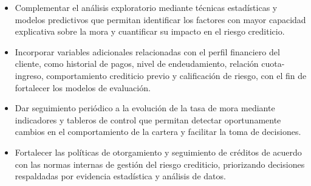 \begin{itemize}
    \item Complementar el análisis exploratorio mediante técnicas estadísticas y modelos predictivos que permitan identificar los factores con mayor capacidad explicativa sobre la mora y cuantificar su impacto en el riesgo crediticio.
    \item Incorporar variables adicionales relacionadas con el perfil financiero del cliente, como historial de pagos, nivel de endeudamiento, relación cuota-ingreso, comportamiento crediticio previo y calificación de riesgo, con el fin de fortalecer los modelos de evaluación.
    \item Dar seguimiento periódico a la evolución de la tasa de mora mediante indicadores y tableros de control que permitan detectar oportunamente cambios en el comportamiento de la cartera y facilitar la toma de decisiones.
    \item Fortalecer las políticas de otorgamiento y seguimiento de créditos de acuerdo con las normas internas de gestión del riesgo crediticio, priorizando decisiones respaldadas por evidencia estadística y análisis de datos.
\end{itemize}
